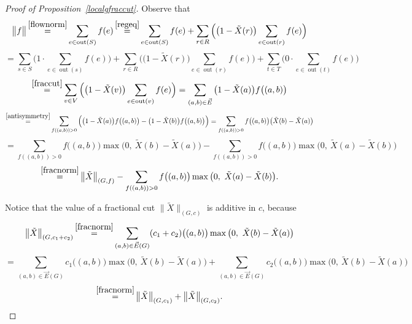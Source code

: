 \documentclass[12pt,a4paper]{article}
\newcommand{\out}{\operatorname{out}}
\newcommand{\vE}{\vec{E}}
\renewcommand{\:}{\colon}
\begin{document}
\begin{proof}[Proof of Proposition~\ref{localgfraccut}]
Observe that
\begin{equation*}
\big\|f\big\| \mathop{=}^{\eqref{flownorm}} \sum_{e \in \out(S)} f(e) \mathop{=}^{\eqref{regeq}} \sum_{e \in \out(S)} f(e) + \sum_{r \in R} \Big( \big(1 - \tilde{X}(r)\big) \sum_{e \in \out(r)} f(e) \Big)
\end{equation*}
\begin{equation*}
= \sum_{s \in S} \Big(1 \cdot \sum_{e \in \out(s)} f(e)\Big) + \sum_{r \in R} \Big( \big(1 - \tilde{X}(r)\big) \sum_{e \in \out(r)} f(e) \Big) + \sum_{t \in T} \Big(0 \cdot \sum_{e \in \out(t)} f(e)\Big)
\end{equation*}
\begin{equation*}
\mathop{=}^{\eqref{fraccut}} \sum_{v \in V} \Big( \big(1 - \tilde{X}(v)\big) \sum_{e \in \out(v)} f(e) \Big) = \sum_{(a, b) \in \vE} \big(1 - \tilde{X}(a)\big) f\big((a, b)\big) \end{equation*}
\begin{equation*}
\mathop{=}^{\eqref{antisymmetry}} \sum_{f((a, b)) > 0} \Big( \big(1 - \tilde{X}(a)\big) f\big((a, b)\big) - \big(1 - \tilde{X}(b)\big) f\big((a, b)\big) \Big) = \sum_{f((a, b)) > 0} f\big((a, b)\big) \big(\tilde{X}(b) - \tilde{X}(a)\big)
\end{equation*}
\begin{equation*}
= \sum_{f((a, b)) > 0} f\big((a, b)\big) \max\big(0,\ \tilde{X}(b) - \tilde{X}(a)\big) - \sum_{f((a, b)) > 0} f\big((a, b)\big) \max\big(0,\ \tilde{X}(a) - \tilde{X}(b)\big)
\end{equation*}
\begin{equation} \label{fraceq}
\mathop{=}^{\eqref{fracnorm}} \big\|\tilde{X}\big\|_{(G, f)} - \sum_{f((a, b)) > 0} f\big((a, b)\big) \max\big(0,\ \tilde{X}(a) - \tilde{X}(b)\big).
\end{equation}

Notice that the value of a fractional cut $\|\tilde{X}\|_{(G, c)}$ is additive in $c$, because
\begin{equation*}
\big\|\tilde{X}\big\|_{(G, c_1 + c_2)} \mathop{=}^{\eqref{fracnorm}}
\sum_{(a, b) \in \vE(G)} (c_1 + c_2)\big((a, b)\big) \max\big(0,\ \tilde{X}(b) - \tilde{X}(a)\big)
\end{equation*}
\begin{equation*}
= \sum_{(a, b) \in \vE(G)} c_1\big((a, b)\big) \max\big(0,\ \tilde{X}(b) - \tilde{X}(a)\big) + \sum_{(a, b) \in \vE(G)} c_2\big((a, b)\big) \max\big(0,\ \tilde{X}(b) - \tilde{X}(a)\big)
\end{equation*}
\begin{equation} \label{additivec}
\mathop{=}^{\eqref{fracnorm}} \big\|\tilde{X}\big\|_{(G, c_1)} + \big\|\tilde{X}\big\|_{(G, c_2)}.
\end{equation}


\end{proof}
\end{document}
